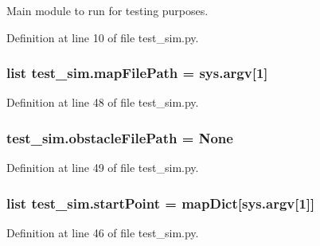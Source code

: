 Main module to run for testing purposes. 



Definition at line 10 of file test\-\_\-sim.\-py.

\hypertarget{namespacetest__sim_a22fa561a6ceff64ebc9a613928ca6cb3}{
\subsubsection[{map\-File\-Path}]{\setlength{\rightskip}{0pt plus 5cm}list test\-\_\-sim.\-map\-File\-Path = sys.\-argv\mbox{[}1\mbox{]}}}\label{namespacetest__sim_a22fa561a6ceff64ebc9a613928ca6cb3}


Definition at line 48 of file test\-\_\-sim.\-py.

\hypertarget{namespacetest__sim_ae11191b484b7492bad167b40d991e12c}{
\subsubsection[{obstacle\-File\-Path}]{\setlength{\rightskip}{0pt plus 5cm}test\-\_\-sim.\-obstacle\-File\-Path = None}}\label{namespacetest__sim_ae11191b484b7492bad167b40d991e12c}


Definition at line 49 of file test\-\_\-sim.\-py.

\hypertarget{namespacetest__sim_a4b3a71baea25193edaa02f6e938da13c}{
\subsubsection[{start\-Point}]{\setlength{\rightskip}{0pt plus 5cm}list test\-\_\-sim.\-start\-Point = {\bf map\-Dict}\mbox{[}sys.\-argv\mbox{[}1\mbox{]}\mbox{]}}}\label{namespacetest__sim_a4b3a71baea25193edaa02f6e938da13c}


Definition at line 46 of file test\-\_\-sim.\-py.

